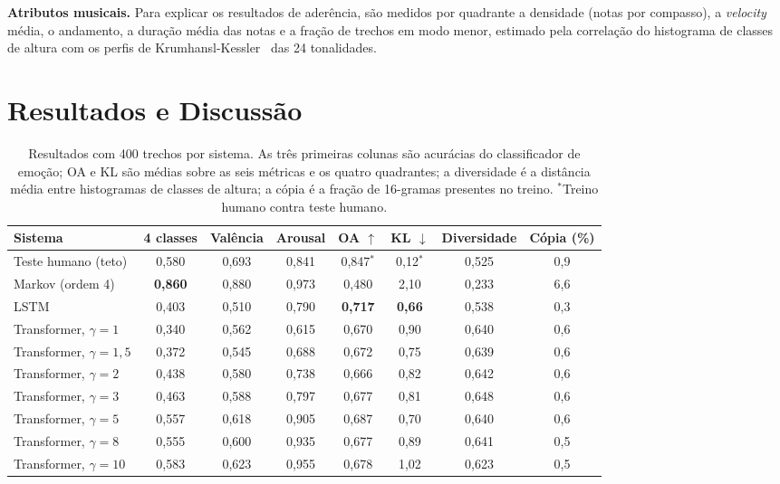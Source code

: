 \documentclass{article}
\begin{document}
\textbf{Atributos musicais.} Para explicar os resultados de aderência, são
medidos por quadrante a densidade (notas por compasso), a \emph{velocity}
média, o andamento, a duração média das notas e a fração de trechos em modo
menor, estimado pela correlação do histograma de classes de altura com os
perfis de Krumhansl-Kessler~\cite{Krumhansl1982:keys} das 24 tonalidades.

\section{Resultados e Discussão}\label{sec:results}

\begin{table}[t]
  \centering
  \small
  \begin{tabular}{lccccccc}
    \hline
    Sistema & 4 classes & Valência & Arousal & OA $\uparrow$ & KL $\downarrow$ &
    Diversidade & Cópia (\%) \\
    \hline
    Teste humano (teto)            & 0,580 & 0,693 & 0,841 & 0,847$^*$ & 0,12$^*$ & 0,525 & 0,9 \\
    Markov (ordem 4)               & \textbf{0,860} & 0,880 & 0,973 & 0,480 & 2,10 & 0,233 & 6,6 \\
    LSTM                           & 0,403 & 0,510 & 0,790 & \textbf{0,717} & \textbf{0,66} & 0,538 & 0,3 \\
    Transformer, $\gamma = 1$      & 0,340 & 0,562 & 0,615 & 0,670 & 0,90 & 0,640 & 0,6 \\
    Transformer, $\gamma = 1{,}5$  & 0,372 & 0,545 & 0,688 & 0,672 & 0,75 & 0,639 & 0,6 \\
    Transformer, $\gamma = 2$      & 0,438 & 0,580 & 0,738 & 0,666 & 0,82 & 0,642 & 0,6 \\
    Transformer, $\gamma = 3$      & 0,463 & 0,588 & 0,797 & 0,677 & 0,81 & 0,648 & 0,6 \\
    Transformer, $\gamma = 5$      & 0,557 & 0,618 & 0,905 & 0,687 & 0,70 & 0,640 & 0,6 \\
    Transformer, $\gamma = 8$      & 0,555 & 0,600 & 0,935 & 0,677 & 0,89 & 0,641 & 0,5 \\
    Transformer, $\gamma = 10$     & 0,583 & 0,623 & 0,955 & 0,678 & 1,02 & 0,623 & 0,5 \\
    \hline
  \end{tabular}
  \caption{Resultados com 400 trechos por sistema. As três primeiras colunas
    são acurácias do classificador de emoção; OA e KL são médias sobre as seis
    métricas e os quatro quadrantes; a diversidade é a distância média entre
    histogramas de classes de altura; a cópia é a fração de 16-gramas presentes
    no treino. $^*$Treino humano contra teste humano.}
  \label{tab:main}
\end{table}
\end{document}
